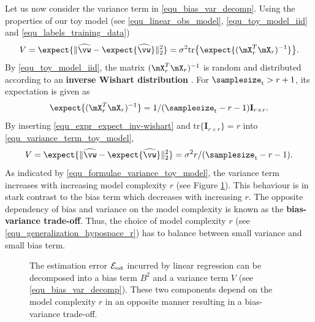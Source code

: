 \documentclass[12pt]{report}
\begin{document}
Let us now consider the variance term in \eqref{equ_bias_var_decomp}. 
Using the properties of our toy model (see \eqref{equ_linear_obs_model}, 
\eqref{equ_toy_model_iid} and \eqref{equ_labels_training_data})
\begin{equation}
\label{equ_variance_term_toy_model}
V = \expect \{ \| \widehat{\vw} - \expect\{ \widehat{\vw} \} \|^{2}_{2} \} = \sigma^{2} \mbox{tr} \big\{ \expect\{(\mX_{r}^{T} \mX_{r})^{-1} \} \big\}.
\end{equation} 
By \eqref{equ_toy_model_iid}, the matrix $(\mX_{r}^{T} \mX_{r})^{-1}$ is 
random and distributed according to an {\bf inverse Wishart distribution} \cite{Mardia1979}. 
For $\samplesize_{\rm t} > r +1$, its expectation is given as 
\begin{equation} 
\label{equ_expr_expect_inv-wishart}
\expect\{(\mX_{r}^{T} \mX_{r})^{-1} \} = 1/(\samplesize_{\rm t}-r-1) \mathbf{I}_{r \times r}.
\end{equation} 
By inserting \eqref{equ_expr_expect_inv-wishart} and $\mbox{tr} \{ \mathbf{I}_{r \times r} \} = r$ into \eqref{equ_variance_term_toy_model}, 
\begin{equation} 
\label{equ_formulae_variance_toy_model}
V= \expect \{ \| \widehat{\vw} - \expect\{ \widehat{\vw} \} \|^{2}_{2} \} = \sigma^{2} r/(\samplesize_{\rm t}-r-1). 
\end{equation} 
As indicated by \eqref{equ_formulae_variance_toy_model}, the 
variance term increases with increasing model complexity $r$ 
(see Figure \ref{fig_bias_variance}). This behaviour is in stark 
contrast to the bias term which decreases with increasing $r$. 
The opposite dependency of bias and variance on the model 
complexity is known as the {\bf bias-variance trade-off}. Thus, 
the choice of model complexity $r$ (see \eqref{equ_generalization_hypospace_r}) 
has to balance between small variance and small bias term. 

\begin{figure}
\begin{center}
\end{center}
\caption{The estimation error $\mathcal{E}_{\rm est}$ incurred by linear 
	regression can be decomposed into a bias term $B^{2}$ and a variance 
	term $V$ (see \eqref{equ_bias_var_decomp}). These two components 
	depend on the model complexity $r$ in an opposite manner resulting in 
	a bias-variance trade-off.}
\label{fig_bias_variance}
\end{figure}
\end{document}
